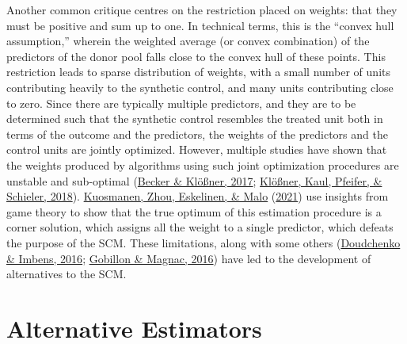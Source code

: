 \documentclass[12pt,nobind, a4paper]{reedthesis}
\begin{document}
 Another common critique centres on the restriction placed on weights: that they must be positive and sum up to one. In technical terms, this is the ``convex hull assumption,'' wherein the weighted average (or convex combination) of the predictors of the donor pool falls close to the convex hull of these points. This restriction leads to sparse distribution of weights, with a small number of units contributing heavily to the synthetic control, and many units contributing close to zero. Since there are typically multiple predictors, and they are to be determined such that the synthetic control resembles the treated unit both in terms of the outcome and the predictors, the weights of the predictors and the control units are jointly optimized. However, multiple studies have shown that the weights produced by algorithms using such joint optimization procedures are unstable and sub-optimal (\protect\hyperlink{ref-becker_estimating_2017}{Becker \& Klößner, 2017}; \protect\hyperlink{ref-klosner_comparative_2018}{Klößner, Kaul, Pfeifer, \& Schieler, 2018}). \protect\hyperlink{ref-kuosmanen_design_2021}{Kuosmanen, Zhou, Eskelinen, \& Malo} (\protect\hyperlink{ref-kuosmanen_design_2021}{2021}) use insights from game theory to show that the true optimum of this estimation procedure is a corner solution, which assigns all the weight to a single predictor, which defeats the purpose of the SCM. These limitations, along with some others (\protect\hyperlink{ref-doudchenko_balancing_2016}{Doudchenko \& Imbens, 2016}; \protect\hyperlink{ref-gobillon_regional_2016}{Gobillon \& Magnac, 2016}) have led to the development of alternatives to the SCM.

 \hypertarget{alt}{%
 \section{Alternative Estimators}\label{alt}}
\end{document}
